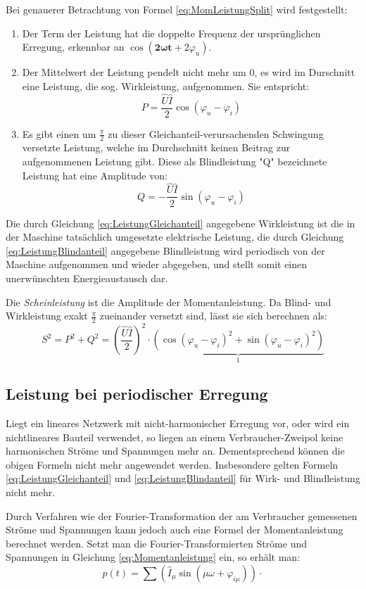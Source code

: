 Bei genauerer Betrachtung von Formel \eqref{eq:MomLeistungSplit} wird festgestellt:
\begin{enumerate}
\item Der Term der Leistung hat die doppelte Frequenz der ursprünglichen Erregung, erkennbar an $\cos(\mathbf{2\omega t} + 2\varphi_u)$. 
\item Der Mittelwert der Leistung pendelt nicht mehr um 0, es wird im Durschnitt eine Leistung, die sog. Wirkleistung, aufgenommen. Sie entspricht:
\begin{equation}
P = \frac{\hat{U}\hat{I}}{2}\cos(\varphi_u-\varphi_i) \label{eq:LeistungGleichanteil}
\end{equation}
\item Es gibt einen um $\frac{\pi}{2}$ zu dieser Gleichanteil-verursachenden Schwingung versetzte Leistung, welche im Durchschnitt keinen Beitrag zur aufgenommenen Leistung gibt. Diese als Blindleistung "Q" bezeichnete Leistung hat eine Amplitude von:
\begin{equation}
Q = -\frac{\hat{U}\hat{I}}{2}\sin(\varphi_u - \varphi_i) \label{eq:LeistungBlindanteil}
\end{equation}
\end{enumerate}

Die durch Gleichung \eqref{eq:LeistungGleichanteil} angegebene Wirkleistung ist die in der Maschine tatsächlich umgesetzte elektrische Leistung, die durch Gleichung \eqref{eq:LeistungBlindanteil} angegebene Blindleistung wird periodisch von der Maschine aufgenommen und wieder abgegeben, und stellt somit einen unerwünschten Energieaustausch dar.

Die \textit{Scheinleistung} ist die Amplitude der Momentanleistung. Da Blind- und Wirkleistung exakt $\frac{\pi}{2}$ zueinander versetzt sind, lässt sie sich berechnen als:
\begin{equation}
S^2=P^2 + Q^2 = \left(\frac{\hat{U}\hat{I}}{2}\right)^2\cdot \underbrace{(\cos(\varphi_u - \varphi_i)^2 + \sin(\varphi_u - \varphi_i)^2)}_{1}
\end{equation}

\subsection{Leistung bei periodischer Erregung}
Liegt ein lineares Netzwerk mit nicht-harmonischer Erregung vor, oder wird ein nichtlineares Bauteil verwendet, so liegen an einem Verbraucher-Zweipol keine harmonischen Ströme und Spannungen mehr an. Dementsprechend können die obigen Formeln nicht mehr angewendet werden. Insbesondere gelten Formeln \eqref{eq:LeistungGleichanteil} und \eqref{eq:LeistungBlindanteil} für Wirk- und Blindleistung nicht mehr.

Durch Verfahren wie der Fourier-Transformation der am Verbraucher gemessenen Ströme und Spannungen kann jedoch auch eine Formel der Momentanleistung berechnet werden. Setzt man die Fourier-Transformierten Ströme und Spannungen in Gleichung \eqref{eq:Momentanleistung} ein, so erhält man:
\begin{equation}
p(t)=\sum\left(\hat{I}_\mu\sin(\mu \omega + \varphi_{i\mu})\right) \cdot
\end{equation}